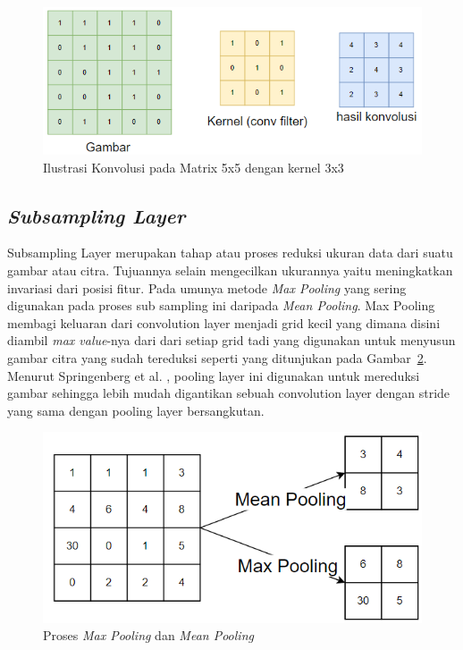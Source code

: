 \begin{figure}[ht]
    \centering
    \includegraphics[width=1.0\textwidth]{gambar/convolution_simulation.png}
    \caption{Ilustrasi Konvolusi pada Matrix 5x5 dengan kernel 3x3}
    \label{fig:ilutrasikonvolusi}  
\end{figure}


\subsection{\emph{Subsampling Layer}}
\label{subsec:subsamplinglayer}

\par Subsampling Layer merupakan tahap atau proses reduksi ukuran data dari suatu gambar atau citra. Tujuannya selain mengecilkan
ukurannya yaitu meningkatkan invariasi dari posisi fitur. Pada umunya metode \emph{Max Pooling} yang sering digunakan pada proses sub sampling ini daripada \emph{Mean Pooling}.
Max Pooling membagi keluaran dari convolution layer menjadi grid kecil yang dimana disini diambil \emph{max value}-nya dari dari setiap grid
tadi yang digunakan untuk menyusun gambar citra yang sudah tereduksi seperti yang ditunjukan pada Gambar~\ref{fig:prosespooling}. Menurut Springenberg et al. \cite{springenberg2014striving}, pooling layer ini digunakan
untuk mereduksi gambar sehingga lebih mudah digantikan sebuah convolution layer dengan stride yang sama dengan pooling layer
bersangkutan\cite{putra2016klasifikasi}.

\begin{figure}[ht]
    \centering
    \includegraphics[width=1.0\textwidth]{gambar/pooling.png}
    \caption{Proses \emph{Max Pooling} dan \emph{Mean Pooling}}
    \label{fig:prosespooling}  
\end{figure}

